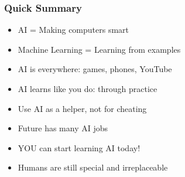 \begin{frame}[fragile]\frametitle{Quick Summary}
\begin{itemize}
\item AI = Making computers smart
\item Machine Learning = Learning from examples
\item AI is everywhere: games, phones, YouTube
\item AI learns like you do: through practice
\item Use AI as a helper, not for cheating
\item Future has many AI jobs
\item YOU can start learning AI today!
\item Humans are still special and irreplaceable
\end{itemize}
\end{frame}
